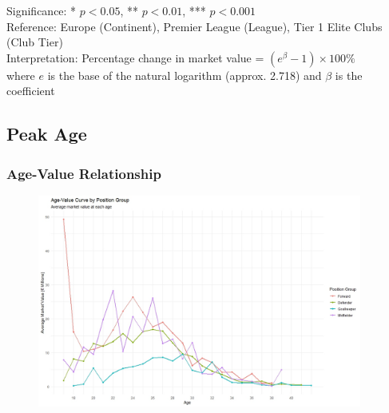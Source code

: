 \documentclass[t,aspectratio=169,xcolor=dvipsnames]{beamer}
\begin{document}
\begin{frame}[shrink=10]
\begin{table}[ht]
        \vspace{1mm}
        {\footnotesize Significance: * $p<0.05$, ** $p<0.01$, *** $p<0.001$ \\
        Reference: Europe (Continent), Premier League (League), Tier 1 Elite Clubs (Club Tier) \\
        Interpretation: Percentage change in market value = $(e^{\beta} - 1) \times 100\%$ \\
        where $e$ is the base of the natural logarithm (approx. 2.718) and $\beta$ is the coefficient}
    \end{table}
\end{frame}
\subsection{Peak Age}
\begin{frame}
    \frametitle{Age-Value Relationship}
    \begin{figure}
        \centering
        \includegraphics[width=0.95\textwidth, height=0.85\textheight, keepaspectratio]{pictures/Age_Value.jpeg}
    \end{figure}
\end{frame}
\end{document}
